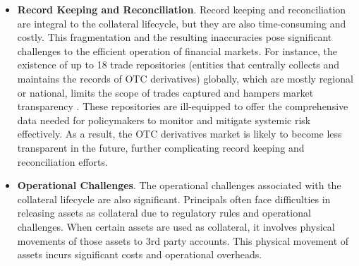 \begin{itemize}
    \item \textbf{Record Keeping and Reconciliation}. Record keeping and reconciliation are integral to the collateral lifecycle, but they are also time-consuming and costly. This fragmentation and the resulting inaccuracies pose significant challenges to the efficient operation of financial markets. For instance, the existence of up to 18 trade repositories (entities that centrally collects and maintains the records of OTC derivatives) globally, which are mostly regional or national, limits the scope of trades captured and hampers market transparency \citep{DTCC_trade_repositories}. These repositories are ill-equipped to offer the comprehensive data needed for policymakers to monitor and mitigate systemic risk effectively. As a result, the OTC derivatives market is likely to become less transparent in the future, further complicating record keeping and reconciliation efforts.

    \item \textbf{Operational Challenges}. The operational challenges associated with the collateral lifecycle are also significant. Principals often face difficulties in releasing assets as collateral due to regulatory rules and operational challenges. When certain assets are used as collateral, it involves physical movements of those assets to 3rd party accounts. This physical movement of assets incurs significant costs and operational overheads.


\end{itemize}
